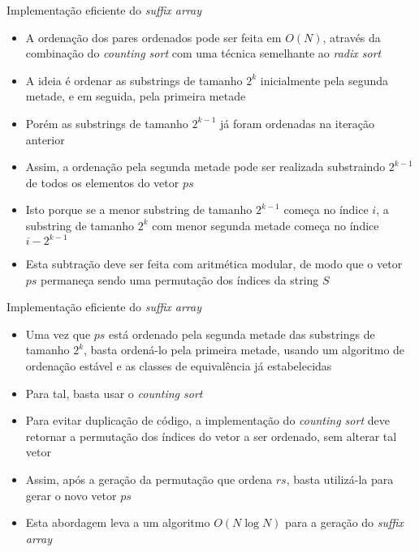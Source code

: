 \begin{frame}[fragile]{Implementação eficiente do {\it suffix array}}

    \begin{itemize}
        \item A ordenação dos pares ordenados pode ser feita em $O(N)$, através da combinação
            do {\it counting sort} com uma técnica semelhante ao {\it radix sort}

        \item A ideia é ordenar as substrings de tamanho $2^k$ inicialmente pela segunda metade, 
            e em seguida, pela primeira metade

        \item Porém as substrings de tamanho $2^{k - 1}$ já foram ordenadas na iteração anterior

        \item Assim, a ordenação pela segunda metade pode ser realizada substraindo
            $2^{k - 1}$ de todos os elementos do vetor $ps$

        \item Isto porque se a menor substring de tamanho $2^{k - 1}$ começa no índice $i$, a
            substring de tamanho $2^k$ com menor segunda metade começa no índice $i - 2^{k - 1}$

        \item Esta subtração deve ser feita com aritmética modular, de modo que o vetor $ps$
            permaneça sendo uma permutação dos índices da string $S$
    \end{itemize}

\end{frame}

\begin{frame}[fragile]{Implementação eficiente do {\it suffix array}}

    \begin{itemize}
        \item Uma vez que $ps$ está ordenado pela segunda metade das substrings de tamanho $2^k$,
            basta ordená-lo pela primeira metade, usando um algoritmo de ordenação estável e 
            as classes de equivalência já estabelecidas

        \item Para tal, basta usar o \textit{counting sort}

        \item Para evitar duplicação de código, a implementação do \textit{counting sort} deve
            retornar a permutação dos índices do vetor a ser ordenado, sem alterar tal vetor

        \item Assim, após a geração da permutação que ordena $rs$, basta utilizá-la para gerar
            o novo vetor $ps$
                
        \item Esta abordagem leva a um algoritmo $O(N\log N)$ para a geração do \textit{suffix
            array}
    \end{itemize}

\end{frame}


